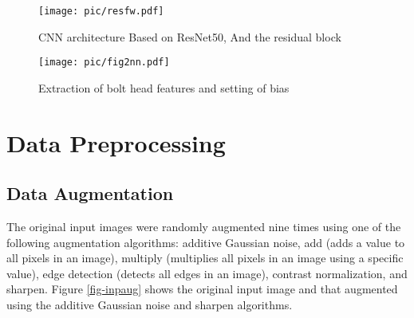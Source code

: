 \documentclass{proc-a4}
\begin{document}
\begin{table}[htbp]
\label{tab-hyperpar}
\end{table}




\begin{figure*}
    \centering
    \texttt{[image: pic/resfw.pdf]}
    \caption{CNN architecture Based on ResNet50, And the residual block}
    \label{fig-resfw}
\end{figure*}

\begin{figure*}
    \centering
    \texttt{[image: pic/fig2nn.pdf]}
    \caption{Extraction of bolt head features and setting of bias}
    \label{fig-fig2nn}
\end{figure*}



\section{Data Preprocessing}

\subsection{Data Augmentation}

The original input images were randomly augmented nine times using one of the following augmentation algorithms: additive Gaussian noise, add (adds a value to all pixels in an image), multiply (multiplies all pixels in an image using a specific value), edge detection (detects all edges in an image), contrast normalization, and sharpen.  Figure \ref{fig-inpaug} shows the original input image and that augmented using the additive Gaussian noise and sharpen algorithms.
\end{document}
